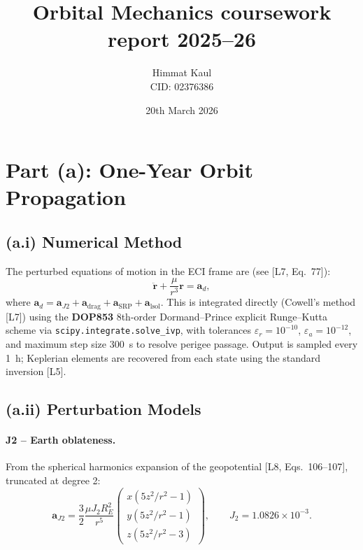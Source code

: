 \documentclass[11pt,a4paper]{article}
\title{\textbf{Orbital Mechanics coursework report 2025--26}}
\author{Himmat Kaul \\ CID: 02376386}
\date{20th March 2026}
\newcommand{\bm}{\mathbf}
\begin{document}
\maketitle
\vspace{-1.5cm}
\section*{Part (a): One-Year Orbit Propagation}

\subsection*{(a.i) Numerical Method}

The perturbed equations of motion in the ECI frame are (see [L7, Eq.~77]):
\begin{equation}
    \ddot{\bm{r}} + \frac{\mu}{r^3}\bm{r} = \bm{a}_d,
    \label{eq:eom}
\end{equation}
where $\bm{a}_d = \bm{a}_{J2} + \bm{a}_{\mathrm{drag}} + \bm{a}_{\mathrm{SRP}} + \bm{a}_{\mathrm{lsol}}$. This is integrated directly (Cowell's method [L7]) using the \textbf{DOP853} 8th-order Dormand--Prince explicit Runge--Kutta scheme via \texttt{scipy.integrate.solve\_ivp}, with tolerances $\varepsilon_r = 10^{-10}$, $\varepsilon_a = 10^{-12}$, and maximum step size \SI{300}{s} to resolve perigee passage. Output is sampled every \SI{1}{h}; Keplerian elements are recovered from each state using the standard inversion [L5].

\subsection*{(a.ii) Perturbation Models}

\paragraph{J2 -- Earth oblateness.}
From the spherical harmonics expansion of the geopotential [L8, Eqs.~106--107], truncated at degree 2:
\begin{equation}
    \bm{a}_{J2} = \frac{3}{2}\frac{\mu J_2 R_E^2}{r^5}
    \begin{pmatrix}
        x\!\left(5z^2/r^2 - 1\right) \\
        y\!\left(5z^2/r^2 - 1\right) \\
        z\!\left(5z^2/r^2 - 3\right)
    \end{pmatrix},
    \qquad J_2 = 1.0826\times10^{-3}.
    \label{eq:j2}
\end{equation}
\end{document}
